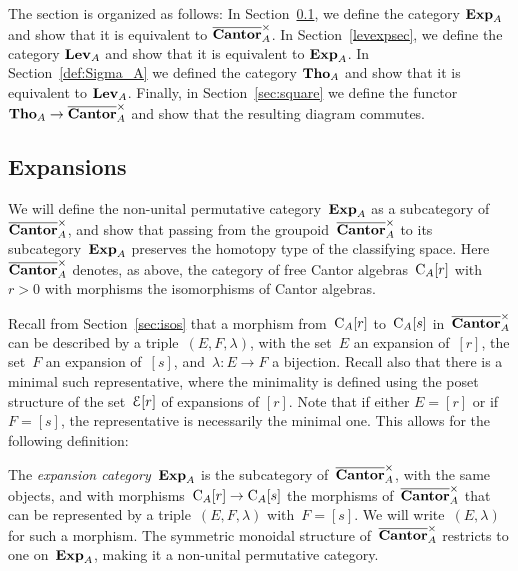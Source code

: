 The section is organized as follows: In Section~\ref{sec:Exp}, we define the category $\mathbf{Exp}_A$ and show that it is equivalent to $\overline{\mathbf{Cantor}}_A^\times$. In Section~\ref{levexpsec}, we define the category $\mathbf{Lev}_A$ and show that it is equivalent to $\mathbf{Exp}_A$. In Section~\ref{def:Sigma_A} we defined the category $\mathbf{Tho}_A$ and show that it is equivalent to $\mathbf{Lev}_A$. Finally, in Section~\ref{sec:square} we define the functor $\mathbf{Tho}_A\to \overline{\mathbf{Cantor}}_A^\times$ and show that the resulting diagram commutes.  




\subsection{Expansions}\label{sec:Exp}

We will define the non-unital permutative category~$\mathbf{Exp}_A$ as a subcategory of~$\overline{\mathbf{Cantor}}_A^\times$, and show that passing from the groupoid~$\overline{\mathbf{Cantor}}_A^\times$ to its subcategory~$\mathbf{Exp}_A$ preserves the homotopy type of the classifying space. Here~$\overline{\mathbf{Cantor}}_A^\times$ denotes, as above, the category of free Cantor algebras~$\mathrm{C}_A[r]$ with~$r>0$ with morphisms the isomorphisms of Cantor algebras.  

Recall from Section~\ref{sec:isos} that 
a morphism from~$\mathrm{C}_A[r]$ to~$\mathrm{C}_A[s]$ in~$\overline{\mathbf{Cantor}}_A^\times$ can be described by a triple~$(E,F,\lambda)$, with the set~$E$ an expansion of~$[r]$, the set~$F$ an expansion of~$[s]$, and~$\lambda\colon E\to F$ a bijection. Recall also that there is a minimal such representative, where the minimality is defined using the poset structure of the set~$\mathcal{E}[r]$ of expansions of $[r]$. 
Note that if either $E=[r]$ or if $F=[s]$, the representative is necessarily the minimal one. 
This allows for the following definition: 



\begin{definition}
The {\em expansion category}~$\mathbf{Exp}_A$ is the subcategory of~$\overline{\mathbf{Cantor}}_A^\times$, with the same objects, and with morphisms~$\mathrm{C}_A[r]\to\mathrm{C}_A[s]$ the morphisms of~$\overline{\mathbf{Cantor}}_A^\times$ that can be represented by a triple~$(E,F,\lambda)$ with~$F=[s]$. 
We will write~$(E,\lambda)$ for such a morphism. The symmetric monoidal structure of~$\overline{\mathbf{Cantor}}_A^\times$ restricts to one on~$\mathbf{Exp}_A$, making it a non-unital permutative category. 
\end{definition}

